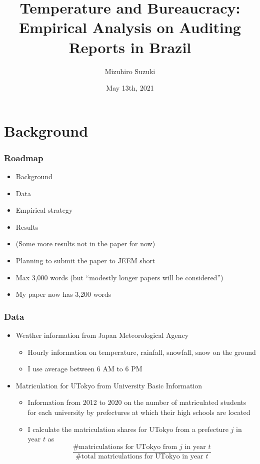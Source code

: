 \documentclass[9pt, pdfmx,hiresbb]{beamer}
\title[Temperature and Exam]{Temperature and Bureaucracy: \\ Empirical Analysis on Auditing Reports in Brazil}
\author[Suzuki]{Mizuhiro Suzuki}
\date{May 13th, 2021}
\begin{document}
\begin{frame}
\titlepage
\end{frame}

\section{Background}
\begin{frame}\frametitle{Roadmap}
  \begin{itemize}
    \item Background
    \item Data
    \item Empirical strategy
    \item Results
    \item (Some more results not in the paper for now)
  \end{itemize}
  \medskip
  \begin{itemize}
    \item Planning to submit the paper to JEEM short 
    \item Max 3,000 words (but ``modestly longer papers will be considered'')
    \item My paper now has 3,200 words
  \end{itemize}
\end{frame}

\begin{frame}\frametitle{Data}
  \begin{itemize}
    \item Weather information from Japan Meteorological Agency
      \begin{itemize}
        \item Hourly information on temperature, rainfall, snowfall, snow on the ground
        \item I use average between 6 AM to 6 PM
      \end{itemize}
    \item Matriculation for UTokyo from University Basic Information
      \begin{itemize}
        \item Information from 2012 to 2020 on the number of matriculated students for each university by prefectures at which their high schools are located
        \item I calculate the matriculation shares for UTokyo from a prefecture $j$ in year $t$ as 
          \begin{equation*}
            \frac{\text{\# matriculations for UTokyo from $j$ in year $t$}}{\text{\# total matriculations for UTokyo in year $t$}}
          \end{equation*}
      \end{itemize}
  \end{itemize}
\end{frame}
\end{document}
